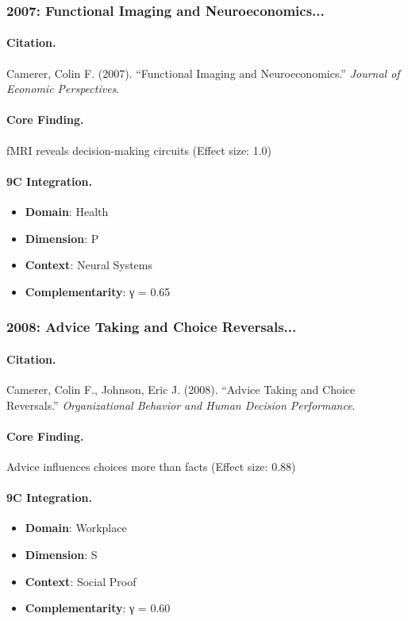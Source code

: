 \subsubsection{2007: Functional Imaging and Neuroeconomics...}

\paragraph{Citation.}
Camerer, Colin F. (2007). ``Functional Imaging and Neuroeconomics.''
\textit{Journal of Economic Perspectives}.

\paragraph{Core Finding.}
fMRI reveals decision-making circuits (Effect size: 1.0)

\paragraph{9C Integration.}
\begin{itemize}[nosep]
  \item \textbf{Domain}: Health
  \item \textbf{Dimension}: P
  \item \textbf{Context}: Neural Systems
  \item \textbf{Complementarity}: γ = 0.65
\end{itemize}

\subsubsection{2008: Advice Taking and Choice Reversals...}

\paragraph{Citation.}
Camerer, Colin F., Johnson, Eric J. (2008). ``Advice Taking and Choice Reversals.''
\textit{Organizational Behavior and Human Decision Performance}.

\paragraph{Core Finding.}
Advice influences choices more than facts (Effect size: 0.88)

\paragraph{9C Integration.}
\begin{itemize}[nosep]
  \item \textbf{Domain}: Workplace
  \item \textbf{Dimension}: S
  \item \textbf{Context}: Social Proof
  \item \textbf{Complementarity}: γ = 0.60
\end{itemize}


